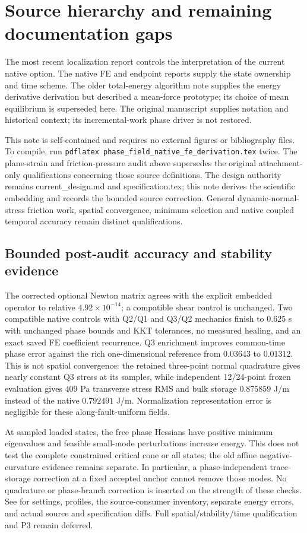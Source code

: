 \documentclass[11pt,a4paper]{article}
\begin{document}
\section{Source hierarchy and remaining documentation gaps}

The most recent localization report controls the interpretation of the current
native option. The native FE and endpoint reports supply the state ownership
and time scheme. The older total-energy algorithm note supplies the energy
derivative derivation but described a mean-force prototype; its choice of mean
equilibrium is superseded here. The original manuscript supplies notation and
historical context; its incremental-work phase driver is not restored.

This note is self-contained and requires no external figures or bibliography
files. To compile, run \texttt{pdflatex phase\_field\_native\_fe\_derivation.tex}
twice. The plane-strain and friction-pressure audit above supersedes the
original attachment-only qualifications concerning those source definitions.
The design authority remains current\_design.md and specification.tex; this
note derives the scientific embedding and records the bounded source correction.
General dynamic-normal-stress friction work, spatial convergence, minimum
selection and native coupled temporal accuracy remain distinct qualifications.

\subsection{Bounded post-audit accuracy and stability evidence}
The corrected optional Newton matrix agrees with the explicit embedded operator
to relative $4.92\times10^{-14}$; a compatible shear control is unchanged.
Two compatible native controls with Q2/Q1 and Q3/Q2 mechanics finish to
$0.625$ s with unchanged phase bounds and KKT tolerances, no measured healing,
and an exact saved FE coefficient recurrence. Q3 enrichment improves common-time
phase error against the rich one-dimensional reference from $0.03643$ to
$0.01312$. This is not spatial convergence: the retained three-point normal
quadrature gives nearly constant Q3 stress at its samples, while independent
12/24-point frozen evaluation gives $409$ Pa transverse stress RMS and bulk
storage $0.875859$ J/m instead of the native $0.792491$ J/m. Normalization
representation error is negligible for these along-fault-uniform fields.

At sampled loaded states, the free phase Hessians have positive minimum
eigenvalues and feasible small-mode perturbations increase energy. This does
not test the complete constrained critical cone or all states; the old affine
negative-curvature evidence remains separate. In particular, a phase-independent
trace-storage correction at a fixed accepted anchor cannot remove those modes.
No quadrature or phase-branch correction is inserted on the strength of these
checks. See  for settings, profiles,
the source-consumer inventory, separate energy errors, and actual source and
specification diffs. Full spatial/stability/time qualification and P3 remain
deferred.
\end{document}
